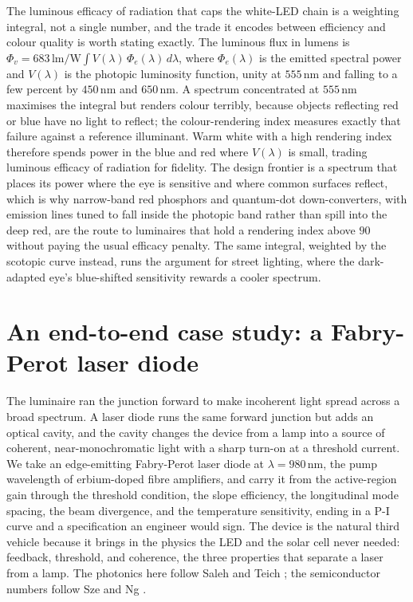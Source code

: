 \begin{mastery}
The luminous efficacy of radiation that caps the white-LED chain is a
weighting integral, not a single number, and the trade it encodes between
efficiency and colour quality is worth stating exactly. The luminous flux
in lumens is $\Phi_{v} = 683\,\si{\lumen\per\watt}\int V(\lambda)\,
\Phi_{e}(\lambda)\,d\lambda$, where $\Phi_{e}(\lambda)$ is the emitted
spectral power and $V(\lambda)$ is the photopic luminosity function,
unity at $555\,\si{\nano\meter}$ and falling to a few percent by
$450\,\si{\nano\meter}$ and $650\,\si{\nano\meter}$. A spectrum
concentrated at $555\,\si{\nano\meter}$ maximises the integral but renders
colour terribly, because objects reflecting red or blue have no light to
reflect; the colour-rendering index measures exactly that failure against
a reference illuminant. Warm white with a high rendering index therefore
spends power in the blue and red where $V(\lambda)$ is small, trading
luminous efficacy of radiation for fidelity. The design frontier is a
spectrum that places its power where the eye is sensitive and where common
surfaces reflect, which is why narrow-band red phosphors and quantum-dot
down-converters, with emission lines tuned to fall inside the photopic
band rather than spill into the deep red, are the route to luminaires that
hold a rendering index above $90$ without paying the usual efficacy
penalty. The same integral, weighted by the scotopic curve instead, runs
the argument for street lighting, where the dark-adapted eye's blue-shifted
sensitivity rewards a cooler spectrum.
\end{mastery}

\section{An end-to-end case study: a Fabry-Perot laser diode}

The luminaire ran the junction forward to make incoherent light spread
across a broad spectrum. A laser diode runs the same forward junction
but adds an optical cavity, and the cavity changes the device from a
lamp into a source of coherent, near-monochromatic light with a sharp
turn-on at a threshold current. We take an edge-emitting Fabry-Perot
laser diode at $\lambda = 980\,\si{\nano\meter}$, the pump wavelength of
erbium-doped fibre amplifiers, and carry it from the active-region gain
through the threshold condition, the slope efficiency, the longitudinal
mode spacing, the beam divergence, and the temperature sensitivity,
ending in a P-I curve and a specification an engineer would sign. The
device is the natural third vehicle because it brings in the physics the
LED and the solar cell never needed: feedback, threshold, and
coherence, the three properties that separate a laser from a lamp. The
photonics here follow Saleh and Teich
\cite{text:saleh-teich-photonics}; the semiconductor numbers follow Sze
and Ng \cite{text:sze-semiconductor}.

